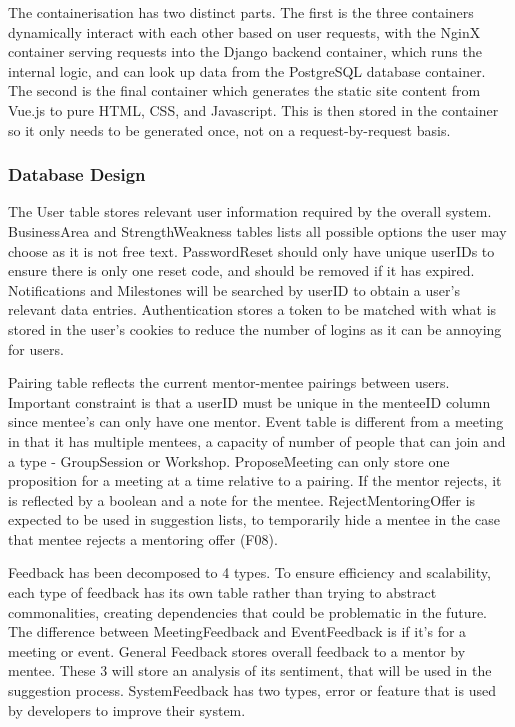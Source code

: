 \documentclass[10pt]{article}
\begin{document}
The containerisation has two distinct parts. The first is the three containers
dynamically interact with each other based on user requests, with the NginX
container serving requests into the Django backend container, which runs the
internal logic, and can look up data from the PostgreSQL database container. The
second is the final container which generates the static site content from
Vue.js to pure HTML, CSS, and Javascript. This is then stored in the container
so it only needs to be generated once, not on a request-by-request basis.

\subsubsection{Database Design}

The User table stores relevant user information required by the overall system.
BusinessArea and StrengthWeakness tables lists all possible options the user may
choose as it is not free text. PasswordReset should only have unique userIDs to
ensure there is only one reset code, and should be removed if it has expired.
Notifications and Milestones will be searched by userID to obtain a user's
relevant data entries. Authentication stores a token to be matched with what is
stored in the user's cookies to reduce the number of logins as it can be
annoying for users.

Pairing table reflects the current mentor-mentee pairings between users.
Important constraint is that a userID must be unique in the menteeID column
since mentee's can only have one mentor. Event table is different from a meeting
in that it has multiple mentees, a capacity of number of people that can join
and a type - GroupSession or Workshop. ProposeMeeting can only store one
proposition for a meeting at a time relative to a pairing. If the mentor
rejects, it is reflected by a boolean and a note for the mentee.
RejectMentoringOffer is expected to be used in suggestion lists, to temporarily
hide a mentee in the case that mentee rejects a mentoring offer (F08).

Feedback has been decomposed to 4 types. To ensure efficiency and scalability,
each type of feedback has its own table rather than trying to abstract
commonalities, creating dependencies that could be problematic in the future.
The difference between MeetingFeedback and EventFeedback is if it's for a
meeting or event. General Feedback stores overall feedback to a mentor by
mentee. These 3 will store an analysis of its sentiment, that will be used in
the suggestion process. SystemFeedback has two types, error or feature that is
used by developers to improve their system.
\end{document}
